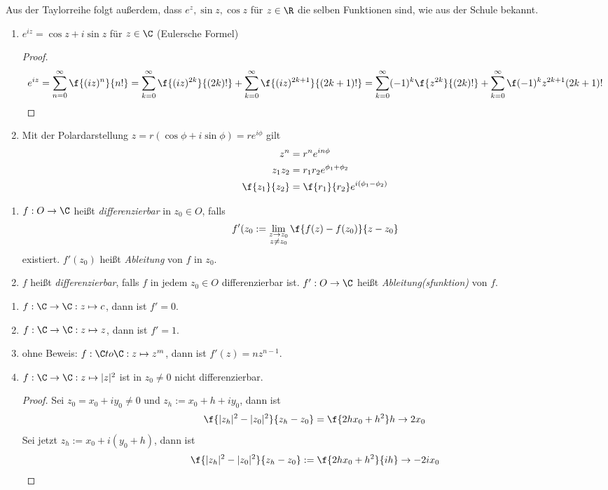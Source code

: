 \documentclass[a4paper,10pt]{scrartcl}
\begin{document}
\begin{nt}
	\label{1.20}
	Aus der Taylorreihe folgt außerdem, dass $e^z, \sin z, \cos z$ für $z\in \R$ die selben Funktionen sind, wie aus der Schule bekannt.
\end{nt}

\begin{prop}
	\label{1.21}
	\begin{enumerate}[1)]
		\item 
			$e^{iz} = \cos z + i \sin z$ für $z\in \C$ (Eulersche Formel)
			\begin{proof}
				\[
					e^{iz} = \sum_{n=0}^\infty \f {(iz)^n}{n!} = \sum_{k=0}^\infty \f {(iz)^{2k}}{(2k)!} + \sum_{k=0}^\infty \f {(iz)^{2k+1}}{(2k+1)!} =
\sum_{k=0}^\infty (-1)^k\f {z^{2k}}{(2k)!} + \sum_{k=0}^\infty \f (-1)^k {z^{2k+1}}{(2k+1)!}
\]
			\end{proof}
		\item
			Mit der Polardarstellung $z = r(\cos \phi + i \sin \phi) = r e^{i\phi}$ gilt
			\begin{align*}
				z^n &= r^n e^{in\phi}\\
				z_1 z_2 &= r_1 r_2 e^{\phi_1 + \phi_2}\\
				\f {z_1}{z_2} &= \f {r_1}{r_2} e^{i(\phi_1-\phi_2)}
			\end{align*}
	\end{enumerate}
\end{prop}

\begin{df}
	\label{df:1.22}
	\begin{enumerate}[1)]
		\item 
			$f: O \to \C$ heißt \emph{differenzierbar} in $z_0\in O$, falls
			\[
				f'(z_0 := \lim_{\substack{z\to z_0 \\ z\neq z_0}}\f {f(z) -f(z_0)}{z-z_0}
			\]
			existiert.
			$f'(z_0)$ heißt \emph{Ableitung} von $f$ in $z_0$.
		\item
			$f$ heißt \emph{differenzierbar}, falls $f$ in jedem $z_0\in O$ differenzierbar ist.
			$f':O\to \C$ heißt \emph{Ableitung(sfunktion)} von $f$.
	\end{enumerate}
\end{df}

\begin{ex*}
	\begin{enumerate}[1)]
		\item 
			$f: \C \to \C : z\mapsto c$, dann ist $f'=0$.
		\item
			$f: \C \to \C : z\mapsto z$, dann ist $f'=1$.
		\item
			ohne Beweis: $f:\C to \C :z\mapsto z^m$, dann ist $f'(z) = nz^{n-1}$.
		\item
			$f: \C\to \C : z\mapsto |z|^2$ ist in $z_0\neq 0$ nicht differenzierbar.
			\begin{proof}
				Sei $z_0 = x_0+iy_0 \neq 0$ und $z_h:= x_0+h +iy_0$, dann ist
				\[
					\f {|z_h|^2 -|z_0|^2}{z_h-z_0} = \f {2hx_0+h^2}h \to 2x_0
				\]
				Sei jetzt $z_h := x_0 + i(y_0+h)$, dann ist
				\[
					\f {|z_h|^2 -|z_0|^2}{z_h-z_0} := \f {2hx_0+h^2}{ih} \to -2ix_0
				\]
			\end{proof}
	\end{enumerate}
\end{ex*}
\end{document}
